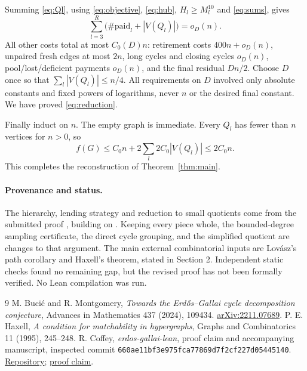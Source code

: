 \documentclass[11pt]{article}
\theoremstyle{remark}\newtheorem*{remark}{Remark}
\begin{document}
Summing \eqref{eq:Ql}, using \eqref{eq:objective}, \eqref{eq:hub},
$H_l\ge M_l^{10}$ and \eqref{eq:sums}, gives
\[
 \sum_{l=3}^R\bigl(\#\mathrm{paid}_l+|V(Q_l)|\bigr)=o_D(n).
\]
All other costs total at most $C_0(D)n$: retirement costs $400n+o_D(n)$,
unpaired fresh edges at most $2n$, long cycles and closing cycles
$o_D(n)$, pool/lost/deficient payments $o_D(n)$, and the final
residual $Dn/2$. Choose $D$ once so that $\sum_l|V(Q_l)|\le n/4$.
All requirements on $D$ involved only absolute constants and fixed
powers of logarithms, never $n$ or the desired final constant.
We have proved \eqref{eq:reduction}.

Finally induct on $n$. The empty graph is immediate. Every $Q_l$ has
fewer than $n$ vertices for $n>0$, so
\[
 f(G)\le C_0n+2\sum_l2C_0|V(Q_l)|\le2C_0n.
\]
This completes the reconstruction of Theorem~\ref{thm:main}.

\paragraph{Provenance and status.}
The hierarchy, lending strategy and reduction to small quotients come
from the submitted proof \cite{Claim}, building on \cite{BM}.
Keeping every piece whole, the bounded-degree sampling certificate,
the direct cycle grouping, and the simplified quotient are changes
to that argument. The main external combinatorial inputs are
Lov\'asz's path corollary and Haxell's theorem, stated in Section 2.
Independent static checks found no remaining gap, but the revised
proof has not been formally verified. No Lean compilation was run.

\begin{thebibliography}{9}
 M. Buci\'c and R. Montgomery,
\emph{Towards the Erd\H{o}s--Gallai cycle decomposition conjecture},
Advances in Mathematics 437 (2024), 109434.
\href{https://arxiv.org/abs/2211.07689}{arXiv:2211.07689}.
 P. E. Haxell,
\emph{A condition for matchability in hypergraphs},
Graphs and Combinatorics 11 (1995), 245--248.
 R. Coffey, \emph{erdos-gallai-lean}, proof claim and
accompanying manuscript, inspected commit
\texttt{660ae11bf3e975fca77869d7f2cf227d05445140}.
\href{https://github.com/steelwheel01/erdos-gallai-lean}{Repository};
\href{https://www.erdosproblems.com/forum/thread/184/proof-claims\#proof-claim-379}{proof claim}.
\end{thebibliography}
\end{document}
